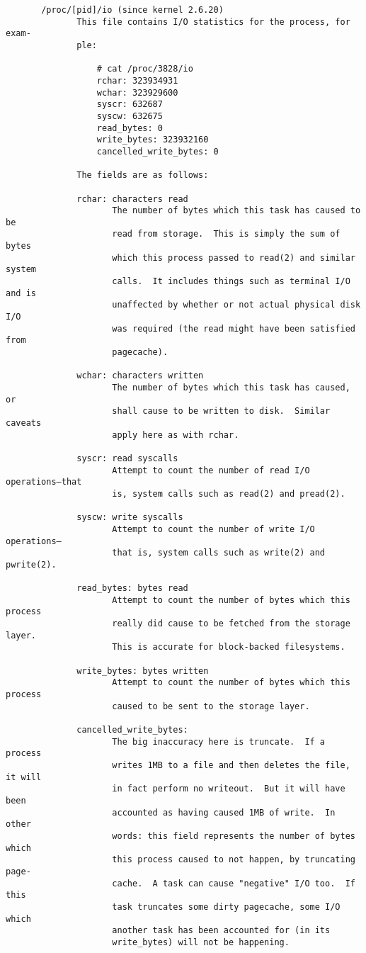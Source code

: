\documentclass[]{article}
\begin{document}
\begin{verbatim}
       /proc/[pid]/io (since kernel 2.6.20)
              This file contains I/O statistics for the process, for exam‐
              ple:

                  # cat /proc/3828/io
                  rchar: 323934931
                  wchar: 323929600
                  syscr: 632687
                  syscw: 632675
                  read_bytes: 0
                  write_bytes: 323932160
                  cancelled_write_bytes: 0

              The fields are as follows:

              rchar: characters read
                     The number of bytes which this task has caused to be
                     read from storage.  This is simply the sum of bytes
                     which this process passed to read(2) and similar system
                     calls.  It includes things such as terminal I/O and is
                     unaffected by whether or not actual physical disk I/O
                     was required (the read might have been satisfied from
                     pagecache).

              wchar: characters written
                     The number of bytes which this task has caused, or
                     shall cause to be written to disk.  Similar caveats
                     apply here as with rchar.

              syscr: read syscalls
                     Attempt to count the number of read I/O operations—that
                     is, system calls such as read(2) and pread(2).

              syscw: write syscalls
                     Attempt to count the number of write I/O operations—
                     that is, system calls such as write(2) and pwrite(2).

              read_bytes: bytes read
                     Attempt to count the number of bytes which this process
                     really did cause to be fetched from the storage layer.
                     This is accurate for block-backed filesystems.

              write_bytes: bytes written
                     Attempt to count the number of bytes which this process
                     caused to be sent to the storage layer.

              cancelled_write_bytes:
                     The big inaccuracy here is truncate.  If a process
                     writes 1MB to a file and then deletes the file, it will
                     in fact perform no writeout.  But it will have been
                     accounted as having caused 1MB of write.  In other
                     words: this field represents the number of bytes which
                     this process caused to not happen, by truncating page‐
                     cache.  A task can cause "negative" I/O too.  If this
                     task truncates some dirty pagecache, some I/O which
                     another task has been accounted for (in its
                     write_bytes) will not be happening.


\end{verbatim}
\end{document}
